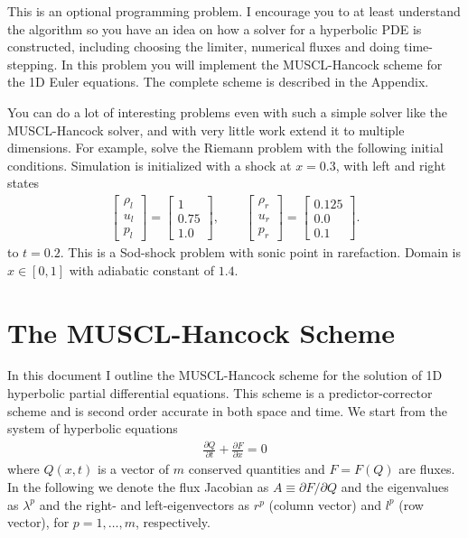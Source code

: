 \documentclass[12pt]{article}
\theoremstyle{definition}
\theoremstyle{definition}
\theoremstyle{definition}
\newcommand{\pfrac}[2]{\frac{\partial #1}{\partial #2}}
\newcommand{\pfracb}[2]{\partial #1/\partial #2}
\begin{document}
This is an optional programming problem. I encourage you to at least
understand the algorithm so you have an idea on how a solver for a
hyperbolic PDE is constructed, including choosing the limiter,
numerical fluxes and doing time-stepping. In this problem you will
implement the MUSCL-Hancock scheme for the 1D Euler equations. The
complete scheme is described in the Appendix.

You can do a lot of interesting problems even with such a simple
solver like the MUSCL-Hancock solver, and with very little work extend
it to multiple dimensions. For example, solve the Riemann problem with
the following initial conditions. Simulation is initialized with a
shock at $x=0.3$, with left and right states
\begin{align*}
  \left[
    \begin{matrix}
      \rho_l \\
      u_l \\
      p_l
    \end{matrix}
  \right]
  = 
  \left[
    \begin{matrix}
      1 \\
      0.75 \\
      1.0
    \end{matrix}
  \right],
  \qquad
  \left[
    \begin{matrix}
      \rho_r \\
      u_r \\
      p_r
    \end{matrix}
  \right]
  = 
  \left[
    \begin{matrix}
      0.125 \\
      0.0 \\
      0.1
    \end{matrix}
  \right].
\end{align*}
to $t=0.2$. This is a Sod-shock problem with sonic point in
rarefaction. Domain is $x \in [0,1]$ with adiabatic constant of $1.4$.

\appendix

\section{The MUSCL-Hancock Scheme}

In this document I outline the MUSCL-Hancock scheme for the solution
of 1D hyperbolic partial differential equations. This scheme is a
predictor-corrector scheme and is second order accurate in both space
and time. We start from the system of hyperbolic equations
\begin{align}
  \pfrac{Q}{t} + \pfrac{F}{x} = 0 \label{eq:cons_form}
\end{align}
where $Q(x,t)$ is a vector of $m$ conserved quantities and $F=F(Q)$
are fluxes. In the following we denote the flux Jacobian as
$A\equiv\pfracb{F}{Q}$ and the eigenvalues as $\lambda^p$ and the
right- and left-eigenvectors as $r^p$ (column vector) and $l^p$ (row
vector), for $p=1,\ldots,m$, respectively.
\end{document}
